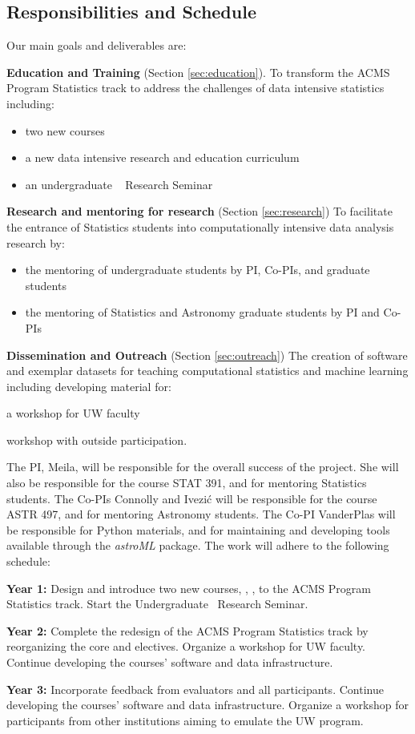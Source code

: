 \subsection{Responsibilities and Schedule}
\noindent Our main goals and deliverables are: 
\bits
\item {\bf Education and Training} (Section \ref{sec:education}).
  To transform the ACMS Program Statistics track to address the
  challenges of data intensive statistics including:
\begin{itemize}
  \item two new courses
  \item a  new data intensive research and education curriculum 
  \item an undergraduate \cdse~ Research Seminar
  \end{itemize}
\item {\bf Research and mentoring for research} (Section \ref{sec:research})
To facilitate the entrance of Statistics students into computationally
intensive data analysis research by:
\begin{itemize}
  \item the mentoring of undergraduate students by PI, Co-PIs, and graduate students
  \item the mentoring of Statistics and Astronomy graduate students by PI and Co-PIs
  \end{itemize}
\item {\bf Dissemination and Outreach} (Section \ref{sec:outreach})
 The creation of software and exemplar datasets for teaching
 computational statistics and machine learning including developing
 material for:
 \bits
  \item a workshop for UW faculty %
  \item workshop with outside participation. 
 \eits
\eits  

The PI, Meila, will be responsible for the overall success of the project. She will also be 
responsible for the course STAT 391, and for mentoring Statistics students. The Co-PIs 
Connolly and Ivezi\'{c} will be responsible for the course ASTR 497, and for mentoring 
Astronomy students. The Co-PI VanderPlas will be responsible for Python materials, 
and for maintaining and developing tools available through the {\it
  astroML} package.  The work will adhere to the following schedule: 
\bits
\item {\bf  Year 1:} Design and introduce two new courses, \statcl, \astrocl, to
the ACMS Program Statistics track. Start the Undergraduate \cdse\ Research Seminar. 
\item {\bf Year 2:} Complete the redesign of the ACMS Program Statistics track
by reorganizing the core and electives. Organize a workshop for UW faculty. 
Continue developing the courses' software and data infrastructure. 
\item {\bf Year 3:} Incorporate feedback from evaluators and all participants. 
Continue developing the courses' software and data infrastructure. 
Organize a workshop for participants from other institutions aiming to 
emulate the UW program.
\eits

